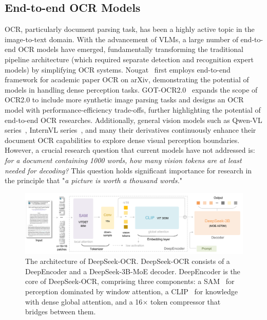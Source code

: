 \documentclass[11pt, a4paper, logo, copyright, nonumbering]{deepseek}
\begin{document}
\begin{CJK*}{UTF8}{gbsn}
\subsection{End-to-end OCR Models}
OCR, particularly document parsing task, has been a highly active topic in the image-to-text domain. With the advancement of VLMs, a large number of end-to-end OCR models have emerged, fundamentally transforming the traditional pipeline architecture (which required separate detection and recognition expert models) by simplifying OCR systems. Nougat~\cite{blecher2023nougat} first employs end-to-end framework for academic paper OCR on arXiv, demonstrating the potential of models in handling dense perception tasks. GOT-OCR2.0~\cite{wei2024general} expands the scope of OCR2.0 to include more synthetic image parsing tasks and designs an OCR model with performance-efficiency trade-offs, further highlighting the potential of end-to-end OCR researches. Additionally, general vision models such as Qwen-VL series~\cite{wang2024qwen2}, InternVL series~\cite{chen2024internvl2}, and many their derivatives continuously enhance their document OCR capabilities to explore dense visual perception boundaries. However, a crucial research question that current models have not addressed is: \textit{for a document containing 1000 words, how many vision tokens are at least needed for decoding?} This question holds significant importance for research in the principle that "\textit{a picture is worth a thousand words.}"

\begin{figure}[ht]
	\centering
    \includegraphics[width=1.0\linewidth]{figures/1.pdf}
	\caption{The architecture of DeepSeek-OCR. DeepSeek-OCR consists of a DeepEncoder and a DeepSeek-3B-MoE decoder. DeepEncoder is the core of DeepSeek-OCR, comprising three components: a SAM~\cite{kirillov2023segment} for perception dominated by window attention, a CLIP~\cite{radford2021learning} for knowledge  with dense global attention, and a 16$\times$ token compressor that bridges between them.}
	\label{fig:architecture}
\end{figure}


\end{CJK*}
\end{document}
